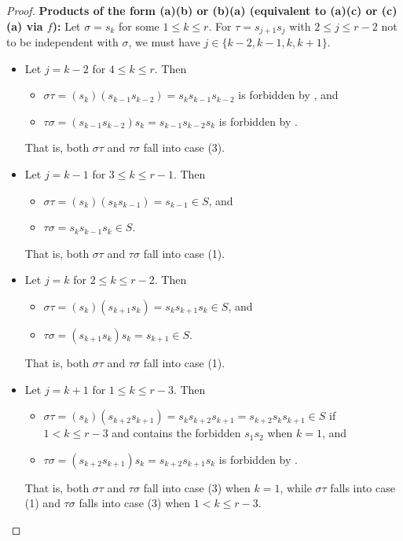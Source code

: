\documentclass{amsart}
\theoremstyle{definition}
\begin{document}
\begin{appendices}
\begin{proof}
\noindent \textbf{Products of the form (a)(b) or (b)(a) (equivalent to (a)(c) or (c)(a) via $f$):}
    Let $\sigma = s_k$ for some $1 \leq k \leq r$. For $\tau = s_{j+1}s_{j}$ with $2\leq j\leq r-2$ not to be independent with $\sigma$, we must have $j\in\{k-2,k-1,k,k+1\}$.
    \begin{itemize}
        \item Let $j=k-2$ for $4\leq k\leq r$. Then \begin{itemize}
            \item $\sigma\tau=(s_k)(s_{k-1}s_{k-2})=s_ks_{k-1}s_{k-2}$ is forbidden by , and
            \item $\tau\sigma=(s_{k-1}s_{k-2})s_k=s_{k-1}s_{k-2}s_k$ is forbidden by .
        \end{itemize}
        {That is, both $\sigma\tau$ and $\tau\sigma$ fall into case (3).}
        \item Let $j=k-1$ for $3\leq k\leq r-1$. Then \begin{itemize}
            \item $\sigma\tau=(s_k)(s_k s_{k-1})=s_{k-1}\in S$, and
            \item $\tau\sigma=s_ks_{k-1}s_k\in S$.
        \end{itemize}
        {That is, both $\sigma\tau$ and $\tau\sigma$ fall into case (1).}
        \item Let $j=k$ for $2\leq k\leq r-2$. Then \begin{itemize}
            \item $\sigma\tau=(s_k)(s_{k+1}s_k)=s_k s_{k+1} s_k\in S$, and
            \item $\tau\sigma=(s_{k+1}s_k)s_k=s_{k+1}\in S$.
        \end{itemize} 
        {That is, both $\sigma\tau$ and $\tau\sigma$ fall into case (1).}
        \item Let $j=k+1$ for $1\leq k\leq r-3$. Then\begin{itemize}
            \item $\sigma\tau=(s_k)(s_{k+2}s_{k+1})=s_k s_{k+2}s_{k+1}=s_{k+2}s_k s_{k+1}\in S$ if $1<k\leq r-3$ and contains the forbidden $s_1s_2$ when $k=1$, and
            \item $\tau\sigma=(s_{k+2}s_{k+1})s_k=s_{k+2}s_{k+1}s_k$ is forbidden by .
        \end{itemize}
        That is, both $\sigma\tau$ and $\tau\sigma$ fall into case (3) when $k=1$, while $\sigma\tau$ falls into case (1) and $\tau\sigma$ falls into case (3) when $1<k\le r-3$.
    \end{itemize}


\end{proof}
\end{appendices}
\end{document}
